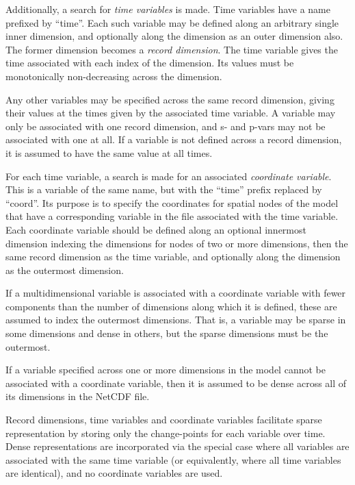 Additionally, a search for \emph{time variables} is
made. Time variables have a name prefixed by ``time''. Each such variable may
be defined along an arbitrary single inner dimension, and optionally along the
 dimension as an outer dimension also. The former dimension becomes
a \emph{record dimension}. The time variable gives the
time associated with each index of the dimension. Its values must be
monotonically non-decreasing across the dimension.

Any other variables may be specified across the same record dimension,
giving their values at the times given by the associated time variable.
A variable may only be associated with one record dimension, and s- and
p-vars may not be associated with one at all. If a variable is not defined
across a record dimension, it is assumed to have the same value at all
times.

For each time variable, a search is made for an associated \emph{coordinate
  variable}. This is a variable of the same name,
but with the ``time'' prefix replaced by ``coord''. Its purpose is to specify
the coordinates for spatial nodes of the model that have a corresponding
variable in the file associated with the time variable. Each coordinate
variable should be defined along an optional innermost dimension indexing the
dimensions for nodes of two or more dimensions, then the same record dimension
as the time variable, and optionally along the  dimension as the
outermost dimension.

If a multidimensional variable is associated with a coordinate variable with
fewer components than the number of dimensions along which it is defined,
these are assumed to index the outermost dimensions. That is, a variable may
be sparse in some dimensions and dense in others, but the sparse dimensions
must be the outermost.

If a variable specified across one or more dimensions in the model cannot be
associated with a coordinate variable, then it is assumed to be dense across
all of its dimensions in the NetCDF file.

Record dimensions, time variables and coordinate variables facilitate sparse
representation by storing only the change-points for each variable over
time. Dense representations are incorporated via the special case where all
variables are associated with the same time variable (or equivalently, where
all time variables are identical), and no coordinate variables are used.

